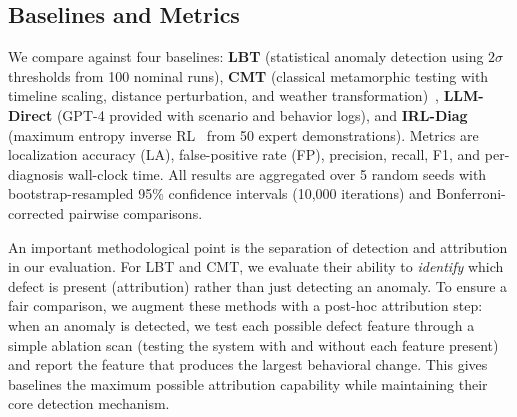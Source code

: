 \documentclass[journal]{IEEEtran}
\theoremstyle{plain}
\begin{document}
\begin{table}[t]
\centering\footnotesize
{}
\caption{Eight Implanted Defect Types with Realistic Root Causes}
\label{tab:defects}
\end{table}

\subsection{Baselines and Metrics}

We compare against four baselines: \textbf{LBT} (statistical anomaly detection using $2\sigma$ thresholds from 100 nominal runs), \textbf{CMT} (classical metamorphic testing with timeline scaling, distance perturbation, and weather transformation)~\cite{deng2023rmt,riccio2023effectiveness}, \textbf{LLM-Direct} (GPT-4 provided with scenario and behavior logs), and \textbf{IRL-Diag} (maximum entropy inverse RL~\cite{ng2000policy} from 50 expert demonstrations). Metrics are localization accuracy (LA), false-positive rate (FP), precision, recall, F1, and per-diagnosis wall-clock time. All results are aggregated over 5 random seeds with bootstrap-resampled 95\% confidence intervals (10,000 iterations) and Bonferroni-corrected pairwise comparisons.

An important methodological point is the separation of detection and attribution in our evaluation. For LBT and CMT, we evaluate their ability to \emph{identify} which defect is present (attribution) rather than just detecting an anomaly. To ensure a fair comparison, we augment these methods with a post-hoc attribution step: when an anomaly is detected, we test each possible defect feature through a simple ablation scan (testing the system with and without each feature present) and report the feature that produces the largest behavioral change. This gives baselines the maximum possible attribution capability while maintaining their core detection mechanism.
\end{document}
